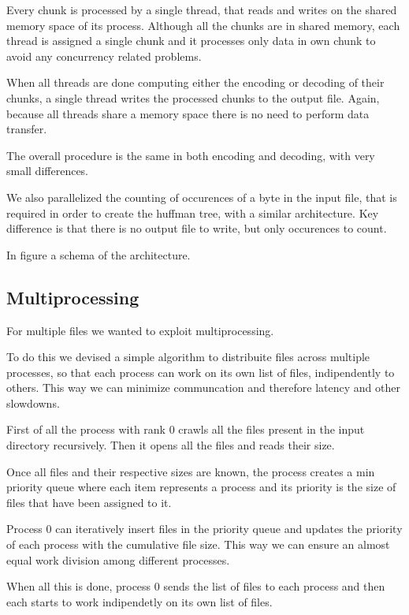 Every chunk is processed by a single thread, that reads and writes on the shared memory space of its process. Although all the chunks are in shared memory, each thread is assigned a single chunk and it processes only data in own chunk to avoid any concurrency related problems.

When all threads are done  computing either the encoding or decoding of their chunks, a single thread writes the processed chunks to the output file.
Again, because all threads share a memory space there is no need to perform data transfer.


The overall procedure is the same in both encoding and decoding, with very small differences. 

We also parallelized the counting of occurences of a byte in the input file, that is required in order to create the huffman tree, with a similar architecture.  Key difference is that there is no output file to write, but only occurences to count.

In figure a schema of the architecture. 

\subsection{Multiprocessing}

For multiple files we wanted to exploit multiprocessing.

To do this we devised a simple algorithm to distribuite files across multiple processes, so that each process can work on its own list of files, indipendently to others. This way we can minimize communcation and therefore latency and other slowdowns.


First of all the process with rank 0 crawls all the files present in the input directory recursively. Then it opens all the files and reads their size. 

Once all files and their respective sizes are known, the process creates a min priority queue where each item represents a process and its priority is the  size of files that have been assigned to it.

Process 0 can iteratively insert files in the priority queue and updates the priority of each process with the cumulative file size. This way we can ensure an almost equal work division among different processes. 

When all this is done, process 0 sends the list of files to each process and then each starts to work indipendetly on its own list of files.



